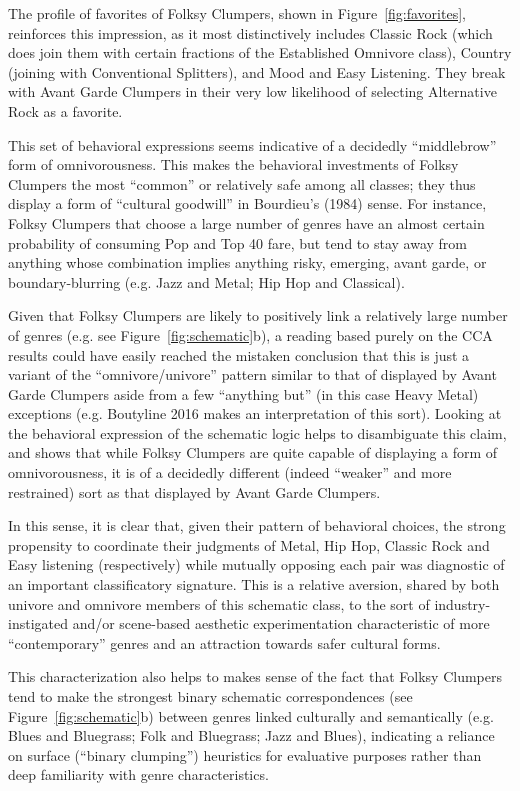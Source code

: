 \documentclass[preprint,12pt]{elsarticle}
\begin{document}
The profile of favorites of Folksy Clumpers, shown in Figure~\ref{fig:favorites}, reinforces this impression, as it most distinctively includes Classic Rock (which does join them with certain fractions of the Established Omnivore class), Country (joining with Conventional Splitters), and Mood and Easy Listening. They break with Avant Garde Clumpers in their very low likelihood of selecting Alternative Rock as a favorite. 

This set of behavioral expressions seems indicative of a decidedly ``middlebrow'' form of omnivorousness. This makes the behavioral investments of Folksy Clumpers the most ``common'' or relatively safe among all classes; they thus display a form of ``cultural goodwill'' in Bourdieu's (1984) sense. For instance, Folksy Clumpers that choose a large number of genres have an almost certain probability of consuming Pop and Top 40 fare, but tend to stay away from anything whose combination implies anything risky, emerging, avant garde, or boundary-blurring (e.g. Jazz and Metal; Hip Hop and Classical). 

Given that Folksy Clumpers are likely to positively link a relatively large number of genres (e.g. see Figure~\ref{fig:schematic}b), a reading based purely on the CCA results could have easily reached the mistaken conclusion that this is just a variant of the ``omnivore/univore'' pattern similar to that of displayed by Avant Garde Clumpers aside from a few ``anything but'' (in this case Heavy Metal) exceptions (e.g. Boutyline 2016 makes an interpretation of this sort). Looking at the behavioral expression of the schematic logic helps to disambiguate this claim, and shows that while Folksy Clumpers are quite capable of displaying a form of omnivorousness, it is of a decidedly different (indeed ``weaker'' and more restrained) sort as that displayed by Avant Garde Clumpers.

In this sense, it is clear that, given their pattern of behavioral choices, the strong propensity to coordinate their judgments of Metal, Hip Hop, Classic Rock and Easy listening (respectively) while mutually opposing each pair was diagnostic of an important classificatory signature. This is a relative aversion, shared by both univore and omnivore members of this schematic class, to the sort of industry-instigated and/or scene-based aesthetic experimentation characteristic of more ``contemporary'' genres and an attraction towards safer cultural forms. 

This characterization also helps to makes sense of the fact that Folksy Clumpers tend to make the strongest binary schematic correspondences (see Figure~\ref{fig:schematic}b) between genres linked culturally and semantically (e.g. Blues and Bluegrass; Folk and Bluegrass; Jazz and Blues), indicating a reliance on surface (``binary clumping'') heuristics for evaluative purposes rather than deep familiarity with genre characteristics.
\end{document}
